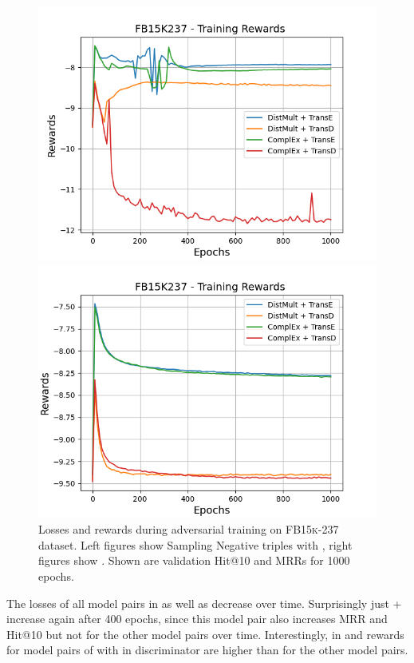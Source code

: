 \begin{figure}
    \begin{minipage}{.5\textwidth}
      \centering
      \includegraphics[width=0.9\linewidth]{figures/results/gan_train/not_pretrained/uncertainty/max/entropy/fb15k237/1k_epochs/uncertainty_fb15k237_rew.png}
    \end{minipage}%
    \begin{minipage}{.5\textwidth}
      \centering
      \includegraphics[width=0.9\linewidth]{figures/results/gan_train/not_pretrained/uncertainty/max_distribution/entropy/fb15k237/1k_epochs/uncertainty_fb15k237_rew.png}
    \end{minipage}%
    \caption{Losses and rewards during adversarial training on \textsc{FB15k-237} dataset. 
    Left figures show Sampling Negative triples with \usmax, right figures show \ussoftmax.
    Shown are validation Hit@10 and MRRs for 1000 epochs.}
    \label{fig:advtrain_fb15k237_usmax_ussoftmax_losses_rewards}
\end{figure}
The losses of all model pairs in \usmax as well as \ussoftmax decrease over time.
Surprisingly just \complex + \transe increase again after 400 epochs, since this model pair also increases MRR and Hit@10 but not for the other model pairs over time.
Interestingly, in \usmax and \ussoftmax rewards for model pairs of with \transe in discriminator are higher than for the other model pairs.